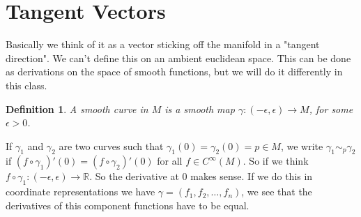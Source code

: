 \documentclass[a4paper]{article}
\newtheorem*{defn}{Definition}
\begin{document}
\section*{Tangent Vectors}
Basically we think of it as a vector sticking off the manifold in a "tangent direction". We can't define this on an ambient euclidean space. This can be done as derivations on the space of smooth functions, but we will do it differently in this class. 

\begin{defn}
    A smooth curve in $M$ is a smooth map $\gamma: (-\epsilon, \epsilon) \rightarrow M$, for some $\epsilon > 0$. 
\end{defn}
If $\gamma_1$ and $\gamma_2$ are two curves such that $\gamma_1(0) = \gamma_2(0) = p \in M$, we write $\gamma_1 \sim_{p} \gamma_2$ if $(f \circ \gamma_1)'(0) = (f \circ \gamma_2)'(0)$ for all $f \in C^{\infty}(M)$. So if we think $f \circ \gamma_1: (-\epsilon, \epsilon) \rightarrow \mathds{R}$. So the derivative at $0$ makes sense. If we do this in coordinate representations we have $\gamma = (f_1, f_2, \dots, f_n)$, we see that the derivatives of this component functions have to be equal.
\end{document}
